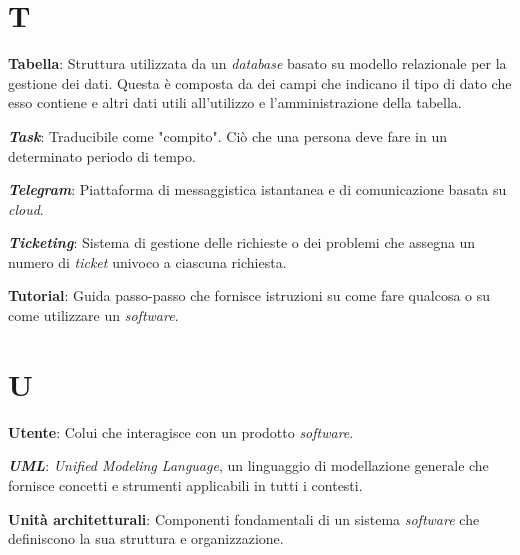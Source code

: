 \documentclass[5pt]{article}
\begin{document}
\section*{T}
\begin{flushleft}

\textbf{Tabella}: Struttura utilizzata da un \textit{database} basato su modello relazionale per la gestione dei dati. Questa è composta da dei campi che indicano il tipo di dato che esso contiene e altri dati utili all'utilizzo e l'amministrazione della tabella.\newline

\textbf{\textit{Task}}: Traducibile come "compito". Ciò che una persona deve fare in un determinato periodo di tempo.\newline

\textbf{\textit{Telegram}}: Piattaforma di messaggistica istantanea e di comunicazione basata su \textit{cloud}.\newline

\textbf{\textit{Ticketing}}: Sistema di gestione delle richieste o dei problemi che assegna un numero di \textit{ticket} univoco a ciascuna richiesta.\newline

\textbf{Tutorial}: Guida passo-passo che fornisce istruzioni su come fare qualcosa o su come utilizzare un \textit{software}.\newline



\end{flushleft}

\pagebreak

\section*{U}
\begin{flushleft}

\textbf{Utente}: Colui che interagisce con un prodotto \textit{software}.\newline

\textbf{\textit{UML}}: \textit{Unified Modeling Language}, un linguaggio di modellazione generale che fornisce concetti e strumenti applicabili in tutti i contesti.\newline

\textbf{Unità architetturali}: Componenti fondamentali di un sistema \textit{software} che definiscono la sua struttura e organizzazione.\newline


\end{flushleft}
\end{document}
